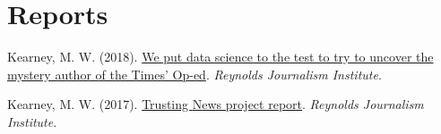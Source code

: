 \section{Reports}
\begin{bibenum}
\item Kearney, M. W. (2018). \href{https://www.rjionline.org/stories/we-put-data-science-to-the-test-to-try-to-uncover-the-mystery-author-of-the}{We put data science to the test to try to uncover the mystery author of the Times’ Op-ed}.
\textit{Reynolds Journalism Institute}.
\item Kearney, M. W. (2017). \href{https://www.rjionline.org/reporthtml.html}{Trusting {N}ews project report}.
\textit{Reynolds Journalism Institute}.
\end{bibenum}
